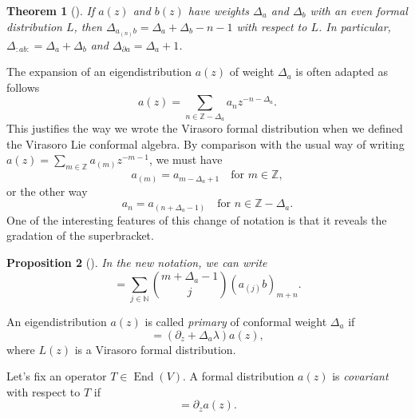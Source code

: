 \documentclass[a4paper, 12pt, reqno]{amsart}
\newtheorem{theorem}{Theorem}[section]
\newtheorem{proposition}[theorem]{Proposition}
\theoremstyle{remark}
\numberwithin{equation}{subsection}
\DeclareMathOperator{\End}{End}
\begin{document}
\begin{theorem}[{\cite[Proposition 3.7.4]{nozaradan_introduction_2008}}]
  \label{thr:13}
  If $a(z)$ and $b(z)$ have weights $\Delta_a$ and $\Delta_b$ with an even formal distribution $L$, then $\Delta_{a_{(n)}b} = \Delta_a + \Delta_b - n - 1$ with respect to $L$.
  In particular, $\Delta_{:ab:} = \Delta_a + \Delta_b$ and $\Delta_{\partial a} = \Delta_a + 1$.
\end{theorem}

The expansion of an eigendistribution $a(z)$ of weight $\Delta_a$ is often adapted as follows
\begin{equation*}
  a(z) = \sum_{n \in \mathbb{Z} - \Delta_a}a_nz^{-n - \Delta_a}.
\end{equation*}
This justifies the way we wrote the Virasoro formal distribution when we defined the Virasoro Lie conformal algebra.
By comparison with the usual way of writing $a(z) = \sum_{m \in \mathbb{Z}}a_{(m)}z^{-m - 1}$, we must have
\begin{equation*}
  a_{(m)} = a_{m - \Delta_a + 1} \quad \text{for }m \in \mathbb{Z},
\end{equation*}
or the other way
\begin{equation*}
  a_n = a_{(n + \Delta_a - 1)} \quad \text{for }n \in \mathbb{Z} - \Delta_a.
\end{equation*}
One of the interesting features of this change of notation is that it reveals the gradation of the superbracket.

\begin{proposition}[{\cite[Proposition 3.7.6]{nozaradan_introduction_2008}}]
  \label{prp:8}
  In the new notation, we can write
  \begin{equation*}
    [a_m, b_n] = \sum_{j \in \mathbb{N}}\binom{m + \Delta_a - 1}{j}(a_{(j)}b)_{m + n}.
  \end{equation*}
\end{proposition}

An eigendistribution $a(z)$ is called \emph{primary} of conformal weight $\Delta_a$ if
\begin{equation*}
  [L_{\lambda}a(z)] = (\partial_z + \Delta_a\lambda)a(z),
\end{equation*}
where $L(z)$ is a Virasoro formal distribution.

Let's fix an operator $T \in \End(V)$.
A formal distribution $a(z)$ is \emph{covariant} with respect to $T$ if
\begin{equation*}
  [T, a(z)] = \partial_za(z).
\end{equation*}
\end{document}
